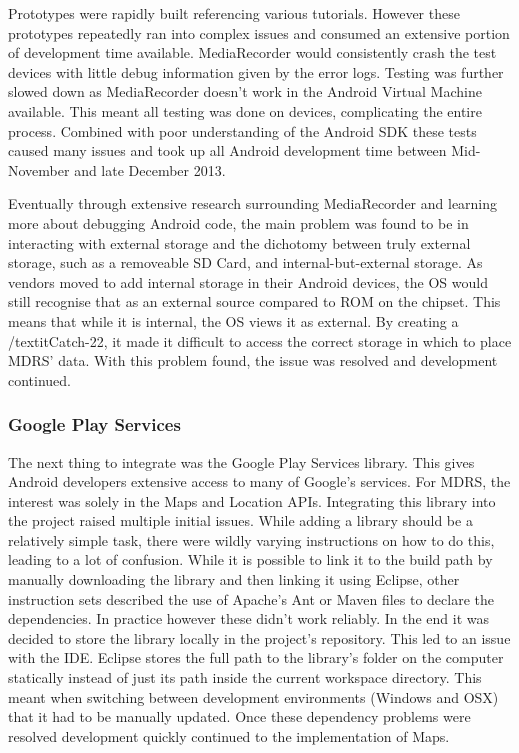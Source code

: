 \documentclass{l3proj}
\begin{document}
Prototypes were rapidly built referencing various tutorials. However these prototypes repeatedly ran into complex issues and consumed an extensive portion of development time available. MediaRecorder would consistently crash the test devices with little debug information given by the error logs. Testing was further slowed down as MediaRecorder doesn't work in the Android Virtual Machine available. This meant all testing was done on devices, complicating the entire process. Combined with poor understanding of the Android SDK these tests caused many issues and took up all Android development time between Mid-November and late December 2013.

Eventually through extensive research surrounding MediaRecorder and learning more about debugging Android code, the main problem was found to be in interacting with external storage and the dichotomy between truly external storage, such as a removeable SD Card, and internal-but-external storage. As vendors moved to add internal storage in their Android devices, the OS would still recognise that as an external source compared to ROM on the chipset. This means that while it is internal, the OS views it as external. By creating a /textit{Catch-22}, it made it difficult to access the correct storage in which to place MDRS' data. With this problem found, the issue was resolved and development continued.

\subsubsection{Google Play Services}    The next thing to integrate was the Google Play Services library. This gives Android developers extensive access to many of Google's services. For MDRS, the interest was solely in the Maps and Location APIs. Integrating this library into the project raised multiple initial issues. While adding a library should be a relatively simple task, there were wildly varying instructions on how to do this, leading to a lot of confusion. While it is possible to link it to the build path by manually downloading the library and then linking it using Eclipse, other instruction sets described the use of Apache's Ant or Maven files to declare the dependencies. In practice however these didn't work reliably. In the end it was decided to store the library locally in the project's repository. This led to an issue with the IDE. Eclipse stores the full path to the library's folder on the computer statically instead of just its path inside the current workspace directory. This meant when switching between development environments (Windows and OSX) that it had to be manually updated. Once these dependency problems were resolved development quickly continued to the implementation of Maps.
\end{document}
